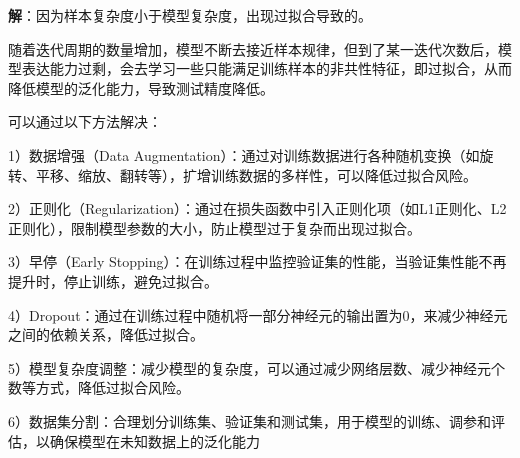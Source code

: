 \documentclass[UTF8]{ctexart}
\begin{document}
	\noindent \textbf{解}：因为样本复杂度小于模型复杂度，出现过拟合导致的。
	
	随着迭代周期的数量增加，模型不断去接近样本规律，但到了某一迭代次数后，模型表达能力过剩，会去学习一些只能满足训练样本的非共性特征，即过拟合，从而降低模型的泛化能力，导致测试精度降低。
	
	可以通过以下方法解决：
	
	1）数据增强（Data Augmentation）：通过对训练数据进行各种随机变换（如旋转、平移、缩放、翻转等），扩增训练数据的多样性，可以降低过拟合风险。
	
	2）正则化（Regularization）：通过在损失函数中引入正则化项（如L1正则化、L2正则化），限制模型参数的大小，防止模型过于复杂而出现过拟合。
	
	3）早停（Early Stopping）：在训练过程中监控验证集的性能，当验证集性能不再提升时，停止训练，避免过拟合。
	
	4）Dropout：通过在训练过程中随机将一部分神经元的输出置为0，来减少神经元之间的依赖关系，降低过拟合。
	
	5）模型复杂度调整：减少模型的复杂度，可以通过减少网络层数、减少神经元个数等方式，降低过拟合风险。
	
	6）数据集分割：合理划分训练集、验证集和测试集，用于模型的训练、调参和评估，以确保模型在未知数据上的泛化能力
	
\end{document}
